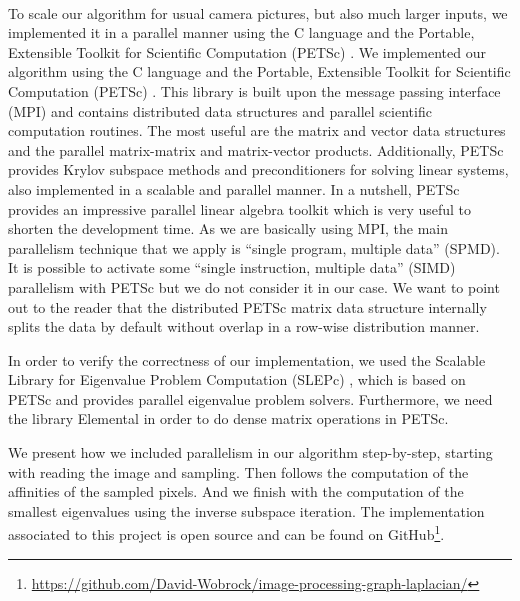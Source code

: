 \paragraph{}
\ifthesis
 To scale our algorithm for usual camera pictures, but also much larger inputs, we implemented it in a parallel manner using the C language and the Portable, Extensible Toolkit for Scientific Computation (PETSc) \cite{petsc_web_page}.
\else
 We implemented our algorithm using the C language and the Portable, Extensible Toolkit for Scientific Computation (PETSc) \cite{petsc_web_page}.
\fi
This library is built upon the message passing interface (MPI) and contains distributed data structures and parallel scientific computation routines.
\ifthesis
 The most useful are the matrix and vector data structures and the parallel matrix-matrix and matrix-vector products.
 Additionally, PETSc provides Krylov subspace methods and preconditioners for solving linear systems, also implemented in a scalable and parallel manner.
 In a nutshell, PETSc provides an impressive parallel linear algebra toolkit which is very useful to shorten the development time.
 As we are basically using MPI, the main parallelism technique that we apply is ``single program, multiple data'' (SPMD).
 It is possible to activate some ``single instruction, multiple data'' (SIMD) parallelism with PETSc but we do not consider it in our case.
 We want to point out to the reader that the distributed PETSc matrix data structure internally splits the data by default without overlap in a row-wise distribution manner.

 In order to verify the correctness of our implementation, we used the Scalable Library for Eigenvalue Problem Computation (SLEPc) \cite{hernandez_slepc_2005}, which is based on PETSc and provides parallel eigenvalue problem solvers.
 Furthermore, we need the library Elemental \cite{poulson_elemental_2013} in order to do dense matrix operations in PETSc.
\fi

\ifthesis
 We present how we included parallelism in our algorithm step-by-step, starting with reading the image and sampling.
 Then follows the computation of the affinities of the sampled pixels.
 And we finish with the computation of the smallest eigenvalues using the inverse subspace iteration.
\fi
The implementation associated to this project is open source and can be found on GitHub\footnote{\url{https://github.com/David-Wobrock/image-processing-graph-laplacian/}}.
